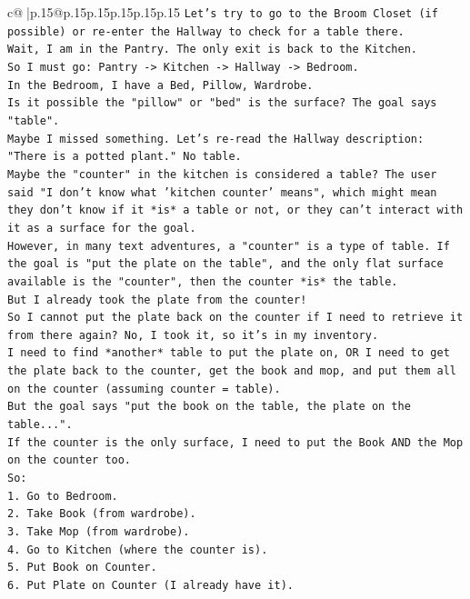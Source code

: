 \documentclass{article}
\begin{document}
{\begin{supertabular}{c@{$\;$}|p{.15\linewidth}@{}p{.15\linewidth}p{.15\linewidth}p{.15\linewidth}p{.15\linewidth}p{.15\linewidth}}
{{{\texttt{Let's try to go to the Broom Closet (if possible) or re{-}enter the Hallway to check for a table there.} \\
\texttt{Wait, I am in the Pantry. The only exit is back to the Kitchen.} \\
\texttt{So I must go: Pantry {-}> Kitchen {-}> Hallway {-}> Bedroom.} \\
\texttt{In the Bedroom, I have a Bed, Pillow, Wardrobe.} \\
\texttt{Is it possible the "pillow" or "bed" is the surface? The goal says "table".} \\
\texttt{Maybe I missed something. Let's re{-}read the Hallway description: "There is a potted plant." No table.} \\
\texttt{Maybe the "counter" in the kitchen is considered a table? The user said "I don't know what 'kitchen counter' means", which might mean they don't know if it *is* a table or not, or they can't interact with it as a surface for the goal.} \\
\texttt{However, in many text adventures, a "counter" is a type of table. If the goal is "put the plate on the table", and the only flat surface available is the "counter", then the counter *is* the table.} \\
\texttt{But I already took the plate from the counter!} \\
\texttt{So I cannot put the plate back on the counter if I need to retrieve it from there again? No, I took it, so it's in my inventory.} \\
\texttt{I need to find *another* table to put the plate on, OR I need to get the plate back to the counter, get the book and mop, and put them all on the counter (assuming counter = table).} \\
\texttt{But the goal says "put the book on the table, the plate on the table...".} \\
\texttt{If the counter is the only surface, I need to put the Book AND the Mop on the counter too.} \\
\texttt{So:} \\
\texttt{1. Go to Bedroom.} \\
\texttt{2. Take Book (from wardrobe).} \\
\texttt{3. Take Mop (from wardrobe).} \\
\texttt{4. Go to Kitchen (where the counter is).} \\
\texttt{5. Put Book on Counter.} \\
\texttt{6. Put Plate on Counter (I already have it).} \\
}}}
\end{supertabular}}
\end{document}
